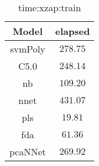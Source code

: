 \begin{table}[!ht]
	\centering
	\begin{tabular}{|c|c|}
		\hline
		Model & elapsed \\ \hline
		svmPoly & $278.75$ \\ \hline
		C5.0 & $248.14$ \\ \hline
		nb & $109.20$ \\ \hline
		nnet & $431.07$ \\ \hline
		pls & $19.81$ \\ \hline
		fda & $61.36$ \\ \hline
		pcaNNet & $269.92$ \\ \hline
	\end{tabular}
	\caption{time:xzap:train}
	\label{tab:time:xzap:train}
\end{table}
